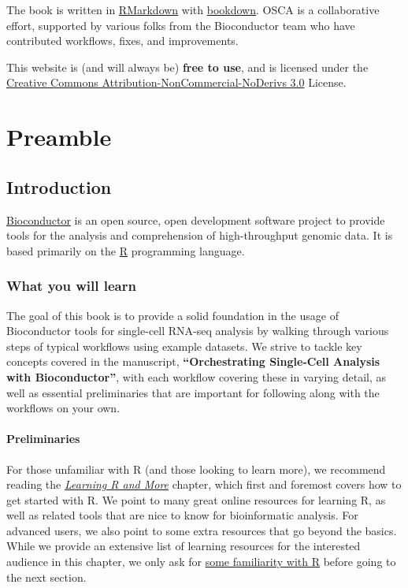 \documentclass[]{book}
\begin{document}
The book is written in \href{https://rmarkdown.rstudio.com}{RMarkdown} with \href{https://bookdown.org}{bookdown}. OSCA is a collaborative effort, supported by various folks from the Bioconductor team who have contributed workflows, fixes, and improvements.

This website is (and will always be) \textbf{free to use}, and is licensed under the \href{http://creativecommons.org/licenses/by-nc-nd/3.0/us/}{Creative Commons Attribution-NonCommercial-NoDerivs 3.0} License.

\hypertarget{part-preamble}{%
\part{Preamble}\label{part-preamble}}

\hypertarget{introduction}{%
\chapter{Introduction}\label{introduction}}

\href{https://bioconductor.org}{Bioconductor} is an open source, open development software project to provide tools for the analysis and comprehension of high-throughput genomic data. It is based primarily on the \href{http://www.r-project.org/}{R} programming language.

\hypertarget{what-you-will-learn}{%
\section{What you will learn}\label{what-you-will-learn}}

The goal of this book is to provide a solid foundation in the usage of Bioconductor tools for single-cell RNA-seq analysis by walking through various steps of typical workflows using example datasets. We strive to tackle key concepts covered in the manuscript, \textbf{``Orchestrating Single-Cell Analysis with Bioconductor''}, with each workflow covering these in varying detail, as well as essential preliminaries that are important for following along with the workflows on your own.

\hypertarget{preliminaries}{%
\subsection{Preliminaries}\label{preliminaries}}

For those unfamiliar with R (and those looking to learn more), we recommend reading the \protect\hyperlink{learning-r-and-more}{\emph{Learning R and More}} chapter, which first and foremost covers how to get started with R. We point to many great online resources for learning R, as well as related tools that are nice to know for bioinformatic analysis. For advanced users, we also point to some extra resources that go beyond the basics. While we provide an extensive list of learning resources for the interested audience in this chapter, we only ask for \protect\hyperlink{getting-started-with-r}{some familiarity with R} before going to the next section.
\end{document}
